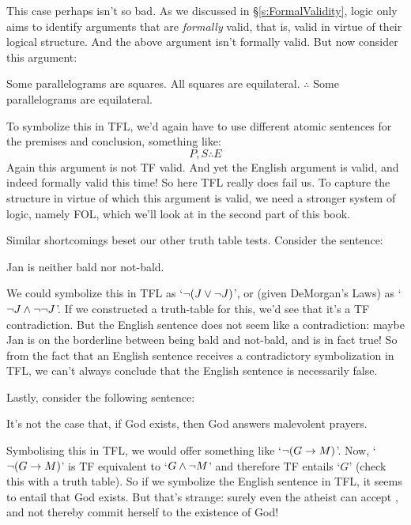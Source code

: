 This case perhaps isn't so bad. As we discussed in \S\ref{s:FormalValidity}, logic only aims to identify arguments that are \emph{formally} valid, that is, valid in virtue of their logical structure. And the above argument isn't formally valid.  But now consider this argument:
 	\begin{earg}
	\setcounter{eargnum}{1}
		\item Some parallelograms are squares.  All squares are equilateral.  $\therefore$ Some parallelograms are equilateral.
	\end{earg}
To symbolize this in TFL, we'd again have to use different atomic sentences for the premises and conclusion, something like:
$$P, S \therefore E$$
Again this argument is not TF valid.  And yet the English argument is valid, and indeed formally valid this time! So here TFL really does fail us.  To capture the structure in virtue of which this argument is valid, we need a stronger system of logic, namely FOL, which we'll look at in the second part of this book.

Similar shortcomings beset our other truth table tests. Consider the sentence:
	\begin{earg}
	\setcounter{eargnum}{2}
		\item\label{n:JanBald} Jan is neither bald nor not-bald.
	\end{earg}
We could symbolize this in TFL as `$\neg (J \vee \neg J)$', or (given DeMorgan's Laws) as `$\neg J \wedge \neg \neg J$'. If we constructed a truth-table for this, we'd see that it's a TF contradiction. But the English sentence  does not seem like a contradiction: maybe Jan is on the borderline between being bald and not-bald, and  is in fact true!  So from the fact that an English sentence receives a contradictory symbolization in TFL, we can't always conclude that the English sentence is necessarily false.


Lastly, consider the following sentence:
	\begin{earg}
	\setcounter{eargnum}{3}
		\item\label{n:GodParadox}	It's not the case that, if God exists, then God answers malevolent prayers.
	\end{earg}
Symbolising this in TFL, we would offer something like `$\neg (G \rightarrow M)$'. Now, `$\neg (G \rightarrow M)$' is TF equivalent to `$G \wedge \neg M$' and therefore TF entails `$G$' (check this with a truth table). So if we symbolize the English sentence  in TFL, it seems to entail that God exists. But that's strange: surely even the atheist can accept , and not thereby commit herself to the existence of God!


